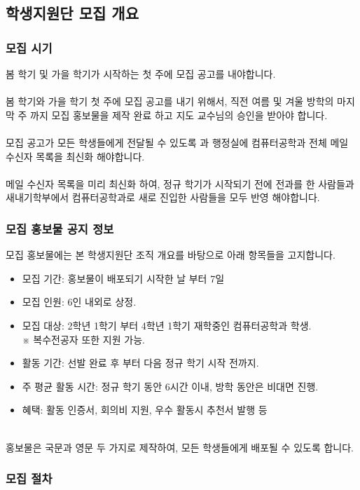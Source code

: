 \subsection{학생지원단 모집 개요}
\subsubsection{모집 시기}
봄 학기 및 가을 학기가 시작하는 첫 주에 모집 공고를 내야합니다.\\
\\
봄 학기와 가을 학기 첫 주에 모집 공고를 내기 위해서, 직전 여름 및 겨울 방학의 마지막 주 까지 모집 홍보물을 제작 완료 하고 지도 교수님의 승인을 받아야 합니다.\\
\\
모집 공고가 모든 학생들에게 전달될 수 있도록 과 행정실에 컴퓨터공학과 전체 메일 수신자 목록을 최신화 해야합니다.\\
\\
메일 수신자 목록을 미리 최신화 하여, 정규 학기가 시작되기 전에 전과를 한 사람들과 새내기학부에서 컴퓨터공학과로 새로 진입한 사람들을 모두 반영 해야합니다.\\

\subsubsection{모집 홍보물 공지 정보}
모집 홍보물에는 본 학생지원단 조직 개요를 바탕으로 아래 항목들을 고지합니다.\\
\begin{itemize}
    \item 모집 기간: 홍보물이 배포되기 시작한 날 부터 7일
    \item 모집 인원: 6인 내외로 상정.
    \item 모집 대상: 2학년 1학기 부터 4학년 1학기 재학중인 컴퓨터공학과 학생.\\
    ※ 복수전공자 또한 지원 가능.
    \item 활동 기간: 선발 완료 후 부터 다음 정규 학기 시작 전까지.
    \item 주 평균 활동 시간: 정규 학기 동안 6시간 이내, 방학 동안은 비대면 진행.
    \item 혜택: 활동 인증서, 회의비 지원, 우수 활동시 추천서 발행 등
\end{itemize}
\text{  }\\
홍보물은 국문과 영문 두 가지로 제작하여, 모든 학생들에게 배포될 수 있도록 합니다.\\

\subsubsection{모집 절차}

